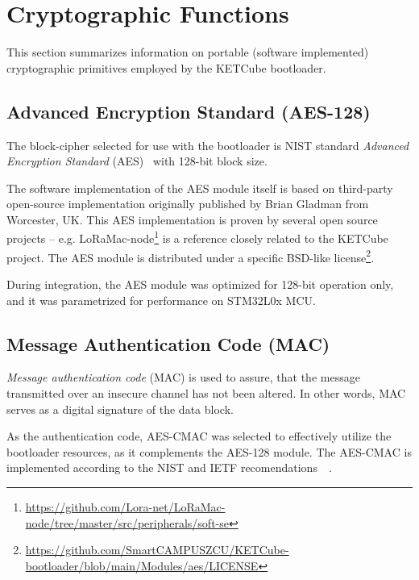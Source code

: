 
\clearpage
\section{Cryptographic Functions}
This section summarizes information on portable (software implemented) cryptographic primitives employed by the KETCube bootloader.

\subsection{Advanced Encryption Standard (AES-128)}

The block-cipher selected for use with the bootloader is NIST standard \textit{Advanced Encryption Standard} (AES)~\cite{NIST:AES} with 128-bit block size. 

The software implementation of the AES module itself is based on third-party open-source implementation originally published by Brian Gladman from Worcester, UK.  This AES implementation is proven by several open source projects -- e.g. LoRaMac-node\footnote{\url{https://github.com/Lora-net/LoRaMac-node/tree/master/src/peripherals/soft-se}} is a reference closely related to the KETCube project. The AES module is distributed under a specific BSD-like license\footnote{\url{https://github.com/SmartCAMPUSZCU/KETCube-bootloader/blob/main/Modules/aes/LICENSE}}.

During integration, the AES module was optimized for 128-bit operation only, and it was parametrized for performance on STM32L0x MCU.



\subsection{Message Authentication Code (MAC)}

\textit{Message authentication code} (MAC) is used to assure, that the message transmitted over an insecure channel has not been altered. In other words, MAC serves as a digital signature of the data block.

As the authentication code, AES-CMAC was selected to effectively utilize the bootloader resources, as it complements the AES-128 module. The AES-CMAC is implemented according to the NIST and IETF recomendations~\cite{NIST:AES-CMAC}~\cite{IETF:AES-CMAC}. 

